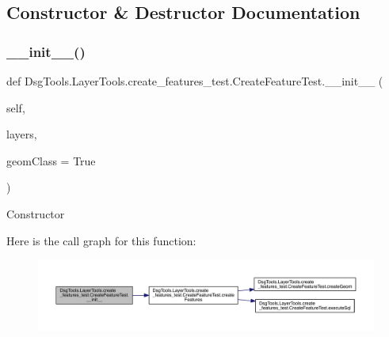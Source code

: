 \subsection{Constructor \& Destructor Documentation}
\mbox{\label{class_dsg_tools_1_1_layer_tools_1_1create__features__test_1_1_create_feature_test_a113d1b62b5bd0b6682c491dd58166374}} 
\subsubsection{\texorpdfstring{\+\_\+\+\_\+init\+\_\+\+\_\+()}{\_\_init\_\_()}}
{\footnotesize\ttfamily def Dsg\+Tools.\+Layer\+Tools.\+create\+\_\+features\+\_\+test.\+Create\+Feature\+Test.\+\_\+\+\_\+init\+\_\+\+\_\+ (\begin{DoxyParamCaption}\item[{}]{self,  }\item[{}]{layers,  }\item[{}]{geom\+Class = {\ttfamily True} }\end{DoxyParamCaption})}

\begin{DoxyVerb}Constructor
\end{DoxyVerb}
 Here is the call graph for this function\+:
\nopagebreak
\begin{figure}[H]
\begin{center}
\leavevmode
\includegraphics[width=350pt]{class_dsg_tools_1_1_layer_tools_1_1create__features__test_1_1_create_feature_test_a113d1b62b5bd0b6682c491dd58166374_cgraph}
\end{center}
\end{figure}


